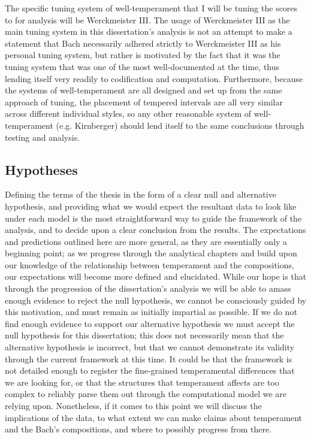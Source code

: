 The specific tuning system of well-temperament that I will be tuning the
scores to for analysis will be Werckmeister III. The usage of
Werckmeister III as the main tuning system in this dissertation's
analysis is not an attempt to make a statement that Bach necessarily
adhered strictly to Werckmeister III as his personal tuning system, but
rather is motivated by the fact that it was the tuning system that was
one of the most well-documented at the time, thus lending itself very
readily to codification and computation. Furthermore, because the
systems of well-temperament are all designed and set up from the same
approach of tuning, the placement of tempered intervals are all very
similar across different individual styles, so any other reasonable
system of well-temperament (e.g. Kirnberger) should lend itself to the
same conclusions through testing and analysis.

    \subsection{Hypotheses}\label{hypotheses}

Defining the terms of the thesis in the form of a clear null and
alternative hypothesis, and providing what we would expect the resultant
data to look like under each model is the most straightforward way to
guide the framework of the analysis, and to decide upon a clear
conclusion from the results. The expectations and predictions outlined
here are more general, as they are essentially only a beginning point;
as we progress through the analytical chapters and build upon our
knowledge of the relationship between temperament and the compositions,
our expectations will become more defined and elucidated. While our hope
is that through the progression of the dissertation's analysis we will
be able to amass enough evidence to reject the null hypothesis, we
cannot be consciously guided by this motivation, and must remain as
initially impartial as possible. If we do not find enough evidence to
support our alternative hypothesis we must accept the null hypothesis
for this dissertation; this does not necessarily mean that the
alternative hypothesis is incorrect, but that we cannot demonstrate its
validity through the current framework at this time. It could be that
the framework is not detailed enough to register the fine-grained
temperamental differences that we are looking for, or that the
structures that temperament affects are too complex to reliably parse
them out through the computational model we are relying upon.
Nonetheless, if it comes to this point we will discuss the implications
of the data, to what extent we can make claims about temperament and the
Bach's compositions, and where to possibly progress from there.


